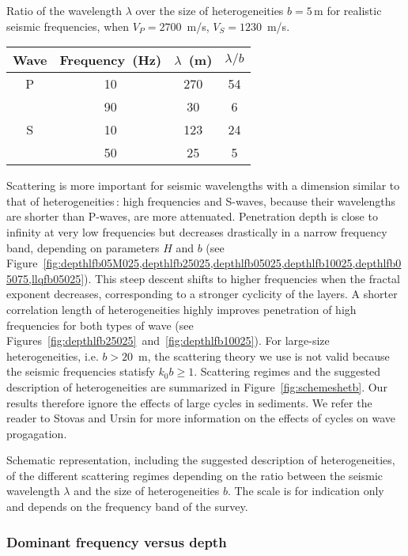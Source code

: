 {Ratio of the wavelength $\lambda$ over the size of heterogeneities $b=5$\,m for realistic seismic frequencies,
when $V_P=2700$~m/s, $V_S=1230$~m/s.}
{
\begin{center}
\begin{tabular}{|c|c|c|c|}
\hline
Wave & Frequency~(Hz) & $\lambda$~(m) & $\lambda/b$ \\
\hline
P & 10  & 270 & 54 \\
  & 90  & 30  &  6 \\ \hline
S & 10  & 123 & 24 \\
  & 50  & 25  &  5 \\
\hline
\end{tabular}
\end{center}
}

Scattering is more important for seismic wavelengths with a dimension similar to that
of heterogeneities\,: high frequencies and S-waves, 
because their wavelengths are shorter than P-waves, are more attenuated.
Penetration depth is close to infinity at very low frequencies
but decreases drastically in a narrow frequency band, depending on parameters $H$ and $b$
(see Figure~\ref{fig:depthlfb05M025,depthlfb25025,depthlfb05025,depthlfb10025,depthlfb05075,llqfb05025}).
This steep descent shifts to higher frequencies 
when the fractal exponent decreases, corresponding to a stronger cyclicity of the layers.
A shorter correlation length of heterogeneities
highly improves penetration of high frequencies for both types of wave
(see Figures~\ref{fig:depthlfb25025}~and~\ref{fig:depthlfb10025}).
For large-size heterogeneities, i.e. $b>20$~m, 
the scattering theory we use is not valid because the seismic frequencies statisfy $k_0b\geq 1$.
Scattering regimes and the suggested description of heterogeneities
are summarized in Figure~\ref{fig:schemeshetb}.
Our results therefore ignore the effects of large cycles in sediments.
We refer the reader to Stovas and Ursin  for more information
on the effects of cycles on wave progagation.

{Schematic representation, including the suggested description of heterogeneities, 
of the different scattering regimes depending on the ratio between
the seismic wavelength $\lambda$ and the size of heterogeneities $b$.
The scale is for indication only and depends on the frequency band of the survey.}

\subsubsection{Dominant frequency versus depth}

